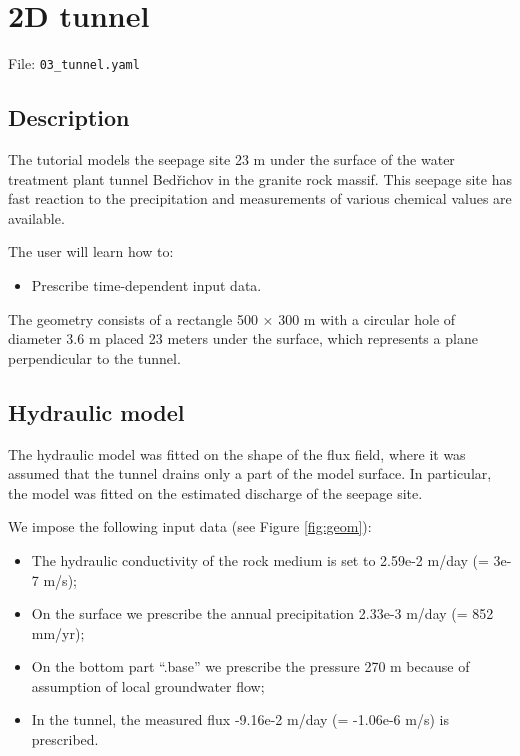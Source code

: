 \section{2D tunnel}\label{d-tunnel}

File: \texttt{03\_tunnel.yaml}

\subsection{Description}\label{description}

The tutorial models the seepage site 23 m under the surface of the water
treatment plant tunnel Bedřichov in the granite rock massif. This
seepage site has fast reaction to the precipitation and measurements of
various chemical values are available.

The user will learn how to:

\begin{itemize}
\tightlist
\item
  Prescribe time-dependent input data.
\end{itemize}

The geometry consists of a rectangle 500 × 300 m with a circular hole of
diameter 3.6 m placed 23 meters under the surface, which represents a
plane perpendicular to the tunnel.

\subsection{Hydraulic model}\label{hydraulic-model}

The hydraulic model was fitted on the shape of the flux field, where it
was assumed that the tunnel drains only a part of the model surface. In
particular, the model was fitted on the estimated discharge of the
seepage site.

We impose the following input data (see Figure \ref{fig:geom}):

\begin{itemize}
\tightlist
\item
  The hydraulic conductivity of the rock medium is set to 2.59e-2 m/day
  (= 3e-7 m/s);
\item
  On the surface we prescribe the annual precipitation 2.33e-3 m/day (=
  852 mm/yr);
\item
  On the bottom part ``.base'' we prescribe the pressure 270 m because
  of assumption of local groundwater flow;
\item
  In the tunnel, the measured flux -9.16e-2 m/day (= -1.06e-6 m/s) is
  prescribed.
\end{itemize}

